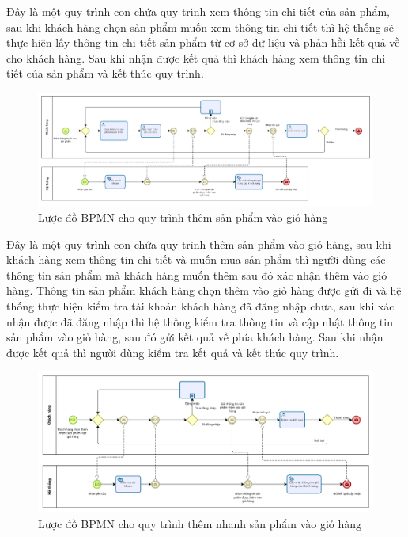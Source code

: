 Đây là một quy trình con chứa quy trình xem thông tin chi tiết của sản phẩm, sau khi khách hàng chọn sản phẩm muốn xem thông tin chi tiết thì hệ thống sẽ thực hiện lấy thông tin chi tiết sản phẩm từ cơ sở dữ liệu và phản hồi kết quả về cho khách hàng. Sau khi nhận được kết quả thì khách hàng xem thông tin chi tiết của sản phẩm và kết thúc quy trình.
 
 
 
\begin{figure}[!htp]
    \centering
    \includegraphics[width=17cm]{img/BPMN/customer_buy/customer_add_to_card.png}
    \newline
    \caption{Lược đồ BPMN cho quy trình thêm sản phẩm vào giỏ hàng}
\end{figure}
 
Đây là một quy trình con chứa quy trình thêm sản phẩm vào giỏ hàng, sau khi khách hàng xem thông tin chi tiết và muốn mua sản phẩm thì người dùng các thông tin sản phẩm mà khách hàng muốn thêm sau đó xác nhận thêm vào giỏ hàng. Thông tin sản phẩm khách hàng chọn thêm vào giỏ hàng được gửi đi và hệ thống thực hiện kiểm tra tài khoản khách hàng đã đăng nhập chưa, sau khi xác nhận được đã đăng nhập thì hệ thống kiểm tra thông tin và cập nhật thông tin sản phẩm vào giỏ hàng, sau đó gửi kết quả về phía khách hàng. Sau khi nhận được kết quả thì người dùng kiểm tra kết quả và kết thúc quy trình.
 
\newpage
 
\begin{figure}[!htp]
    \centering
    \includegraphics[width=16cm]{img/BPMN/customer_buy/customer_add_fast.png}
    \newline
    \caption{Lược đồ BPMN cho quy trình thêm nhanh sản phẩm vào giỏ hàng}
\end{figure}
 
